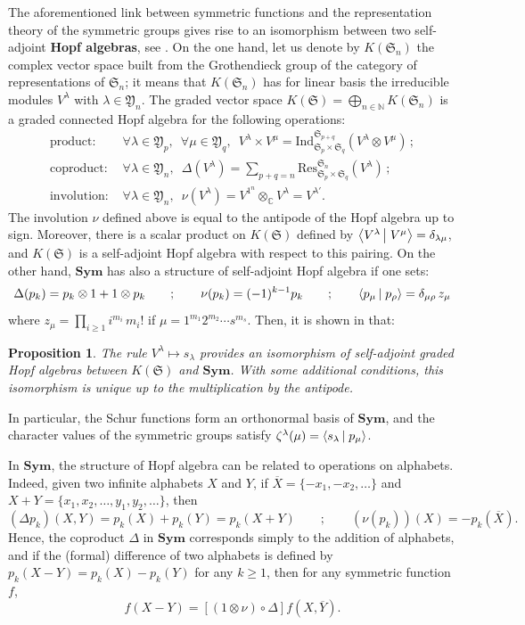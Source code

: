 \documentclass[smallextended,nospthms]{svjour3}
\newtheorem{proposition}[theorem]{Proposition}
\theoremstyle{remark}
\newcommand{\N}{\mathbb{N}}
\newcommand{\C}{\mathbb{C}}
\newcommand{\sym}{\mathfrak{S}}
\newcommand{\Sym}{\mathbf{Sym}}
\newcommand{\ym}{\mathfrak{Y}}
\newcommand{\scal}[2]{\left\langle #1\vphantom{#2}\,\right |\left.#2 \vphantom{#1}\right\rangle}
\begin{document}
The aforementioned link between symmetric functions and the representation theory of the symmetric groups gives rise to an isomorphism between two self-adjoint \textbf{Hopf algebras}, see \cite{Zel81}. On the one hand, let us denote by $K(\sym_{n})$ the complex vector space built from the Grothendieck group of the category of representations of $\sym_{n}$; it means that $K(\sym_{n})$ has for linear basis the irreducible modules $V^{\lambda}$ with $\lambda \in \ym_{n}$. The graded vector space $K(\sym)=\bigoplus_{n \in \N}K(\sym_{n})$ is a graded connected Hopf algebra for the following operations:
\begin{align*}\text{product: }&\forall \lambda \in \ym_{p}, \,\,\,\forall \mu \in \ym_{q},\,\,\,V^{\lambda}\times V^{\mu}= \mathrm{Ind}_{\sym_{p}\times \sym_{q}}^{\sym_{p+q}}(V^{\lambda}\otimes V^{\mu}) \,;\\
\text{coproduct: }&\forall \lambda \in \ym_{n},\,\,\,\Delta(V^{\lambda})=\sum_{p+q=n} \mathrm{Res}_{\sym_{p}\times \sym_{q}}^{\sym_{n}}(V^{\lambda})\,;\\
\text{involution: }&\forall \lambda \in \ym_{n},\,\,\,\nu(V^{\lambda})=V^{1^{n}}\otimes_{\C} V^{\lambda}=V^{\lambda'}.
\end{align*}
The involution $\nu$ defined above is equal to the antipode of the Hopf algebra up to sign. Moreover, there is a scalar product on $K(\sym)$ defined by $\scal{V^{\lambda}}{V^{\mu}}=\delta_{\lambda\mu}$, and $K(\sym)$ is a self-adjoint Hopf algebra with respect to this pairing. On the other hand, $\Sym$ has also a structure of self-adjoint Hopf algebra if one sets:
$$\Delta(p_{k})=p_{k}\otimes 1 + 1 \otimes p_{k}\qquad;\qquad \nu(p_{k})=(-1)^{k-1}p_{k}\qquad;\qquad \scal{p_{\mu}}{p_{\rho}}=\delta_{\mu\rho}\,z_{\mu}$$
where $z_{\mu}=\prod_{i\geq 1}i^{m_{i}}\,m_{i}!$ if $\mu=1^{m_{1}}2^{m_{2}}\cdots s^{m_{s}}$. Then, it is shown in \cite{Zel81} that:
\begin{proposition}
The rule $V^{\lambda}\mapsto s_{\lambda}$ provides an isomorphism of self-adjoint graded Hopf algebras between $K(\sym)$ and $\Sym$. With some additional conditions, this isomorphism is unique up to the multiplication by the antipode.
\end{proposition}
\noindent In particular, the Schur functions form an orthonormal basis of $\Sym$, and the character values of the symmetric groups satisfy $\zeta^{\lambda}(\mu)=\scal{s_{\lambda}}{p_{\mu}}$.
\bigskip
\bigskip

In $\Sym$, the structure of Hopf algebra can be related to operations on alphabets. Indeed, given two infinite alphabets $X$ and $Y$, if $\overline{X}=\{-x_{1},-x_{2},\ldots\}$ and $X+Y=\{x_{1},x_{2},\ldots,y_{1},y_{2},\ldots\}$, then
$$(\Delta p_{k})(X,Y)=p_{k}(X)+p_{k}(Y)=p_{k}(X+Y)\qquad;\qquad (\nu( p_{k}))(X)=-p_{k}(\overline{X}).$$
Hence, the coproduct $\Delta$ in $\Sym$ corresponds simply to the addition of alphabets, and if the (formal) difference of two alphabets is defined by $p_{k}(X-Y)=p_{k}(X)-p_{k}(Y)$ for any $k\geq 1$, then for any symmetric function $f$,
$$f(X-Y)=[(1\otimes \nu) \circ \Delta]f(X,\overline{Y}).$$\bigskip
\end{document}
